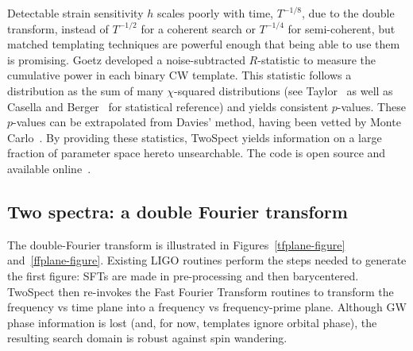 Detectable strain sensitivity $h$ scales poorly with time, $T^{-1/8}$, due to the double transform, instead of $T^{-1/2}$ for a coherent search or $T^{-1/4}$ for semi-coherent, but matched templating techniques are powerful enough that being able to use them is promising.
Goetz developed a noise-subtracted $R$-statistic to measure the cumulative power in each binary CW template.
This statistic follows a distribution as the sum of many $\chi$-squared distributions (see Taylor~\cite{taylor} as well as Casella and Berger~\cite{CasellaBerger2001} for statistical reference) and yields consistent $p$-values.
These $p$-values can be extrapolated from Davies' method, having been vetted by Monte Carlo~\cite{GoetzTwoSpectMethods2011}.
By providing these statistics, TwoSpect yields information on a large fraction of parameter space hereto unsearchable.
The code is open source and available online~\cite{LALAPPSrepo}.



            \subsection{Two spectra: a double Fourier transform}
            \label{two_spectra}


The double-Fourier transform is illustrated in Figures~\ref{tfplane-figure} and~\ref{ffplane-figure}.
Existing LIGO routines perform the steps needed to generate the first figure: SFTs are made in pre-processing and then barycentered.
TwoSpect then re-invokes the Fast Fourier Transform routines to transform the frequency vs time plane into a frequency vs frequency-prime plane.
Although GW phase information is lost (and, for now, templates ignore orbital phase), the resulting search domain is robust against spin wandering.

